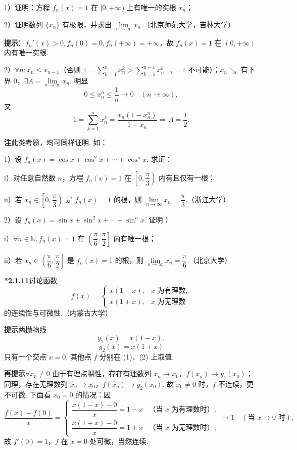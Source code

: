 \documentclass[UTF8,12pt,a4paper,fontset=fandol]{ctexart}
\begin{document}
1）证明：方程 $f_n(x)=1$ 在 $[0,+\infty)$ 上有唯一的实根 $x_n$；

2）证明数列 $\{x_n\}$ 有极限，并求出 $\lim\limits_{n\to\infty}x_n$.（北京师范大学，吉林大学）

\noindent\textbf{提示}）$f_n'(x)>0,f_n(0)=0,f_n(+\infty)=+\infty$，故 $f_n(x)=1$ 在 $(0,+\infty)$ 内有唯一实根.

2）$\forall n:x_n\le x_{n-1}$（否则 $1=\sum\limits_{k=1}^{n}x_n^k>\sum\limits_{k=1}^{n-1}x_{n-1}^k=1$ 不可能）；$x_n\searrow$ 有下界 $0$，$\exists A=\lim\limits_{n\to\infty}x_n$. 明显
\[
  0\le x_n^n\le\frac1n\to0\quad(n\to\infty),
\]
又
\[
  1=\sum_{k=1}^{n}x_n^k=\frac{x_n(1-x_n^n)}{1-x_n}\Rightarrow A=\frac12.
\]

\noindent\textbf{注}\quad 此类考题，均可同样证明. 如：

1）设 $f_n(x)=\cos x+\cos^2x+\cdots+\cos^n x$. 求证：

i）对任意自然数 $n$，方程 $f_n(x)=1$ 在 $\left[0,\dfrac\pi3\right)$ 内有且仅有一根；

ii）若 $x_n\in\left[0,\dfrac\pi3\right)$ 是 $f_n(x)=1$ 的根，则 $\lim\limits_{n\to\infty}x_n=\dfrac\pi3$.（浙江大学）

2）设 $f_n(x)=\sin x+\sin^2x+\cdots+\sin^n x$. 证明：

i）$\forall n\in\mathbb{N},f_n(x)=1$ 在 $\left(\dfrac\pi6,\dfrac\pi2\right]$ 内有唯一根；

ii）若 $x_n\in\left(\dfrac\pi6,\dfrac\pi2\right]$ 是 $f_n(x)=1$ 的根，则 $\lim\limits_{n\to\infty}x_n=\dfrac\pi6$.（北京大学）

\noindent\textbf{*2.1.11}\quad 讨论函数
\[
  f(x)=
  \begin{cases}
    x(1-x), & x\text{ 为有理数},\\
    x(1+x), & x\text{ 为无理数}
  \end{cases}
\]
的连续性与可微性.（内蒙古大学）

\noindent\textbf{提示}\quad 两抛物线
\[
  y_1(x)=x(1-x),
\tag{1}
\]
\[
  y_2(x)=x(1+x)
\tag{2}
\]
只有一个交点 $x=0$. 其他点 $f$ 分别在 (1)、(2) 上取值.

\noindent\textbf{再提示}\quad $\forall x_0\ne0$ 由于有理点稠性，存在有理数列 $x_n\to x_0$，$f(x_n)\to y_1(x_0)$；同理，存在无理数列 $\hat x_n\to x_0$，$f(\hat x_n)\to y_2(x_0)$. 故 $x_0\ne0$ 时，$f$ 不连续，更不可微. 下面看 $x_0=0$ 的情况：因
\[
  \frac{f(x)-f(0)}{x}=
  \begin{cases}
    \dfrac{x(1-x)-0}{x}=1-x & \text{（当 }x\text{ 为有理数时）},\\
    \dfrac{x(1+x)-0}{x}=1+x & \text{（当 }x\text{ 为无理数时）},
  \end{cases}
  \to1\quad(\text{当 }x\to0\text{ 时}),
\]
故 $f'(0)=1$，$f$ 在 $x=0$ 处可微，当然连续.
\end{document}

